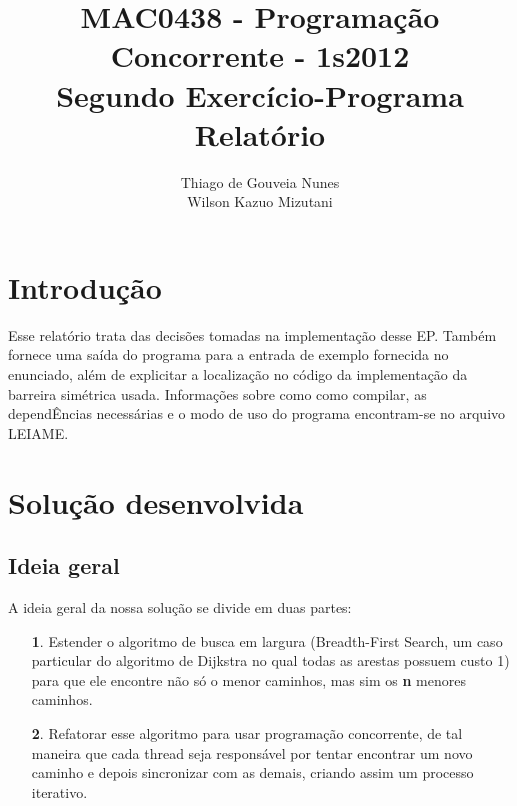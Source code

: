 \documentclass[a4paper,11pt]{article}
\begin{document}
\begin{titlepage}
  \title{MAC0438 - Programação Concorrente - 1s2012 \\ Segundo Exercício-Programa \\ Relatório}
  \author{Thiago de Gouveia Nunes \\ Wilson Kazuo Mizutani}
  \thispagestyle{empty}
\end{titlepage}

\maketitle

\clearpage

\tableofcontents

\clearpage
\section{Introdução}
  Esse relatório trata das decisões tomadas na implementação desse EP. Também
fornece uma saída do programa para a entrada de exemplo fornecida no enunciado,
além de explicitar a localização no código da implementação da barreira
simétrica usada.
  Informações sobre como como compilar, as dependÊncias necessárias e o modo de
uso do programa encontram-se no arquivo LEIAME.

\section{Solução desenvolvida}

  \subsection{Ideia geral}
    A ideia geral da nossa solução se divide em duas partes:
      \begin{itemize}
        \item[\textbf 1.]
          Estender o algoritmo de busca em largura (Breadth-First Search, um
          caso particular do algoritmo de Dijkstra no qual todas as arestas
          possuem custo 1) para que ele encontre não só o menor caminhos, mas
          sim os {\textbf n} menores caminhos.
        \item[\textbf 2.]
          Refatorar esse algoritmo para usar programação concorrente, de tal
          maneira que cada thread seja responsável por tentar encontrar um novo
          caminho e depois sincronizar com as demais, criando assim um processo
          iterativo.
      \end{itemize}
\end{document}
